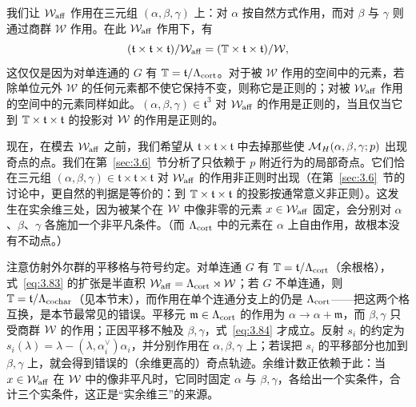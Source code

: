 我们让 ${\mathcal W}_{\rm aff}$ 作用在三元组 $(\alpha,\beta,\gamma)$ 上：对 $\alpha$ 按自然方式作用，而对 $\beta$ 与 $\gamma$ 则通过商群 ${\mathcal W}$ 作用。在此 ${\mathcal W}_{\rm aff}$ 作用下，有
\setcounter{equation}{83}
\begin{equation}\label{eq:3.84}
  (\mathfrak t\times \mathfrak t\times \mathfrak t)/{\mathcal W}_{\rm aff}=({\mathbb{T}}\times\mathfrak t\times \mathfrak t)/
{\mathcal W},
\end{equation}
这仅仅是因为对单连通的 $G$ 有 ${\mathbb{T}}={\mathfrak t}/\Lambda_{\rm cort}$。对于被 $\mathcal W$ 作用的空间中的元素，若除单位元外 $\mathcal W$ 的任何元素都不使它保持不变，则称它是正则的；对被 ${\mathcal W}_{\rm aff}$ 作用的空间中的元素同样如此。$(\alpha,\beta,\gamma)\in {\mathfrak t}^3$ 对 ${\mathcal W}_{\rm aff}$ 的作用是正则的，当且仅当它到 ${\mathbb{T}}\times \mathfrak t\times \mathfrak t$ 的投影对 ${\mathcal W}$ 的作用是正则的。

现在，在模去 ${\mathcal W}_{\rm aff}$ 之前，我们希望从 $\mathfrak t\times \mathfrak t\times \mathfrak t$ 中去掉那些使 ${{\mathcal{M}}_H}(\alpha,\beta,\gamma;p)$ 出现奇点的点。我们在第~\ref{sec:3.6}~节分析了只依赖于 $p$ 附近行为的局部奇点。它们恰在三元组 $(\alpha,\beta,\gamma)\in \mathfrak t\times \mathfrak t\times \mathfrak t$ 对 ${\mathcal W}_{\rm aff}$ 的作用非正则时出现（在第~\ref{sec:3.6}~节的讨论中，更自然的判据是等价的：到 ${\mathbb{T}}\times\mathfrak t\times\mathfrak t$ 的投影按通常意义非正则）。这发生在实余维三处，因为被某个在 ${\mathcal W}$ 中像非零的元素 $x\in {\mathcal W}_{\rm aff}$ 固定，会分别对 $\alpha$、$\beta$、$\gamma$ 各施加一个非平凡条件。（而 $\Lambda_{\rm cort}$ 中的元素在 $\alpha$ 上自由作用，故根本没有不动点。）

\begin{yizhu}[易错点]
注意仿射外尔群的平移格与符号约定。对单连通 $G$ 有 ${\mathbb{T}}=\mathfrak t/\Lambda_{\rm cort}$（余根格），式~\eqref{eq:3.83} 的扩张是半直积 ${\mathcal W}_{\rm aff}=\Lambda_{\rm cort}\rtimes{\mathcal W}$；若 $G$ 不单连通，则 ${\mathbb{T}}=\mathfrak t/\Lambda_{\rm cochar}$（见本节末），而作用在单个连通分支上的仍是 $\Lambda_{\rm cort}$——把这两个格互换，是本节最常见的错误。平移元 $\mathfrak m\in\Lambda_{\rm cort}$ 的作用为 $\alpha\to\alpha+\mathfrak m$，而 $\beta,\gamma$ 只受商群 ${\mathcal W}$ 的作用；正因平移不触及 $\beta,\gamma$，式~\eqref{eq:3.84} 才成立。反射 $s_i$ 的约定为 $s_i(\lambda)=\lambda-(\lambda,\alpha_i^\vee)\alpha_i$，并分别作用在 $\alpha,\beta,\gamma$ 上；若误把 $s_i$ 的平移部分也加到 $\beta,\gamma$ 上，就会得到错误的（余维更高的）奇点轨迹。余维计数正依赖于此：当 $x\in{\mathcal W}_{\rm aff}$ 在 ${\mathcal W}$ 中的像非平凡时，它同时固定 $\alpha$ 与 $\beta,\gamma$，各给出一个实条件，合计三个实条件，这正是“实余维三”的来源。
\end{yizhu}


